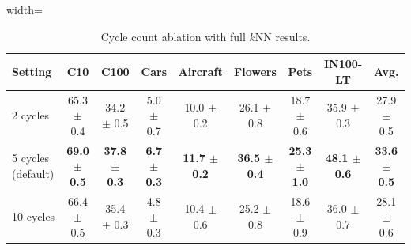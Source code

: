 \begin{table}[H]
\centering
\scriptsize
\setlength{\tabcolsep}{3.5pt}
\caption{Cycle count ablation with full $k$NN results.}
\label{tab:app_cycles_knn}
\begin{adjustbox}{width=\textwidth}
\begin{tabular}{l c c c c c c c c}
\toprule
Setting & C10 & C100 & Cars & Aircraft & Flowers & Pets & IN100-LT & Avg. \\
\midrule
2 cycles & 65.3 {\scriptsize$\pm$ 0.4} & 34.2 {\scriptsize$\pm$ 0.5} & 5.0 {\scriptsize$\pm$ 0.7} & 10.0 {\scriptsize$\pm$ 0.2} & 26.1 {\scriptsize$\pm$ 0.8} & 18.7 {\scriptsize$\pm$ 0.6} & 35.9 {\scriptsize$\pm$ 0.3} & 27.9 {\scriptsize$\pm$ 0.5} \\
5 cycles (default) & \textbf{69.0 {\scriptsize$\pm$ 0.5}} & \textbf{37.8 {\scriptsize$\pm$ 0.3}} & \textbf{6.7 {\scriptsize$\pm$ 0.3}} & \textbf{11.7 {\scriptsize$\pm$ 0.2}} & \textbf{36.5 {\scriptsize$\pm$ 0.4}} & \textbf{25.3 {\scriptsize$\pm$ 1.0}} & \textbf{48.1 {\scriptsize$\pm$ 0.6}} & \textbf{33.6 {\scriptsize$\pm$ 0.5}} \\
10 cycles & 66.4 {\scriptsize$\pm$ 0.5} & 35.4 {\scriptsize$\pm$ 0.3} & 4.8 {\scriptsize$\pm$ 0.3} & 10.4 {\scriptsize$\pm$ 0.6} & 25.2 {\scriptsize$\pm$ 0.8} & 18.6 {\scriptsize$\pm$ 0.9} & 36.0 {\scriptsize$\pm$ 0.7} & 28.1 {\scriptsize$\pm$ 0.6} \\
\bottomrule
\end{tabular}
\end{adjustbox}
\end{table}
